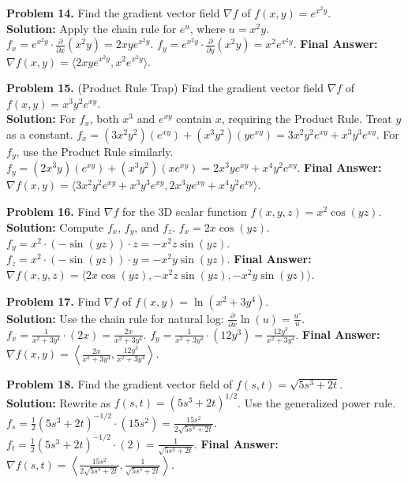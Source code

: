 \documentclass[11pt]{article}
\begin{document}
\vspace{0.3cm}
\textbf{Problem 14.} Find the gradient vector field $\nabla f$ of $f(x, y) = e^{x^2 y}$. \\
\textbf{Solution:}
Apply the chain rule for $e^u$, where $u = x^2 y$.
$f_x = e^{x^2 y} \cdot \frac{\partial}{\partial x}(x^2 y) = 2xy e^{x^2 y}$.
$f_y = e^{x^2 y} \cdot \frac{\partial}{\partial y}(x^2 y) = x^2 e^{x^2 y}$.
\textbf{Final Answer:} $\nabla f(x, y) = \langle 2xy e^{x^2 y}, x^2 e^{x^2 y} \rangle$.

\vspace{0.3cm}
\textbf{Problem 15.} (Product Rule Trap) Find the gradient vector field $\nabla f$ of $f(x, y) = x^3 y^2 e^{xy}$. \\
\textbf{Solution:}
For $f_x$, both $x^3$ and $e^{xy}$ contain $x$, requiring the Product Rule. Treat $y$ as a constant.
$f_x = (3x^2 y^2)(e^{xy}) + (x^3 y^2)(y e^{xy}) = 3x^2 y^2 e^{xy} + x^3 y^3 e^{xy}$.
For $f_y$, use the Product Rule similarly.
$f_y = (2x^3 y)(e^{xy}) + (x^3 y^2)(x e^{xy}) = 2x^3 y e^{xy} + x^4 y^2 e^{xy}$.
\textbf{Final Answer:} $\nabla f(x, y) = \langle 3x^2 y^2 e^{xy} + x^3 y^3 e^{xy}, 2x^3 y e^{xy} + x^4 y^2 e^{xy} \rangle$.

\vspace{0.3cm}
\textbf{Problem 16.} Find $\nabla f$ for the 3D scalar function $f(x, y, z) = x^2 \cos(yz)$. \\
\textbf{Solution:}
Compute $f_x$, $f_y$, and $f_z$.
$f_x = 2x \cos(yz)$.
$f_y = x^2 \cdot (-\sin(yz)) \cdot z = -x^2 z \sin(yz)$.
$f_z = x^2 \cdot (-\sin(yz)) \cdot y = -x^2 y \sin(yz)$.
\textbf{Final Answer:} $\nabla f(x, y, z) = \langle 2x \cos(yz), -x^2 z \sin(yz), -x^2 y \sin(yz) \rangle$.

\vspace{0.3cm}
\textbf{Problem 17.} Find $\nabla f$ of $f(x, y) = \ln(x^2 + 3y^4)$. \\
\textbf{Solution:}
Use the chain rule for natural log: $\frac{\partial}{\partial x} \ln(u) = \frac{u'}{u}$.
$f_x = \frac{1}{x^2 + 3y^4} \cdot (2x) = \frac{2x}{x^2 + 3y^4}$.
$f_y = \frac{1}{x^2 + 3y^4} \cdot (12y^3) = \frac{12y^3}{x^2 + 3y^4}$.
\textbf{Final Answer:} $\nabla f(x, y) = \left\langle \frac{2x}{x^2 + 3y^4}, \frac{12y^3}{x^2 + 3y^4} \right\rangle$.

\vspace{0.3cm}
\textbf{Problem 18.} Find the gradient vector field of $f(s, t) = \sqrt{5s^3 + 2t}$. \\
\textbf{Solution:}
Rewrite as $f(s,t) = (5s^3 + 2t)^{1/2}$. Use the generalized power rule.
$f_s = \frac{1}{2}(5s^3 + 2t)^{-1/2} \cdot (15s^2) = \frac{15s^2}{2\sqrt{5s^3 + 2t}}$.
$f_t = \frac{1}{2}(5s^3 + 2t)^{-1/2} \cdot (2) = \frac{1}{\sqrt{5s^3 + 2t}}$.
\textbf{Final Answer:} $\nabla f(s, t) = \left\langle \frac{15s^2}{2\sqrt{5s^3 + 2t}}, \frac{1}{\sqrt{5s^3 + 2t}} \right\rangle$.
\end{document}
